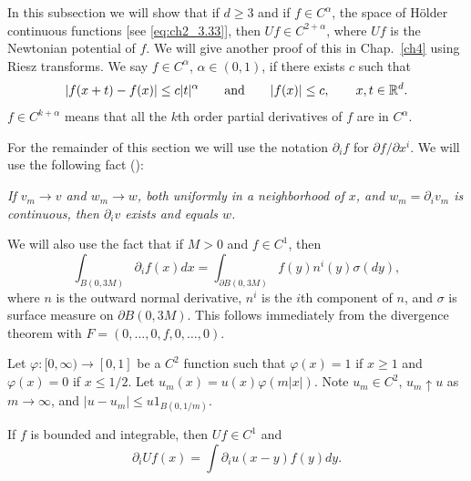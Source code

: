 

In this subsection we will show that if $d \geq 3$ and if $f \in C^\alpha$, the space of H\"older continuous functions [see \eqref{eq:ch2_3.33}], then $Uf \in C^{2+\alpha}$, where $Uf$ is the Newtonian potential of $f$. We will give another proof of this in Chap.\ \ref{ch4} using Riesz transforms. We say $f \in C^\alpha$, $\alpha \in (0,1)$, if there exists $c$ such that
\[
    |f(x+t) - f(x)| \leq c|t|^\alpha \qquad\text{and}\qquad |f(x)| \leq c, \qquad x,t \in \mathbb{R}^d.
\]
$f \in C^{k+\alpha}$ means that all the $k$th order partial derivatives of $f$ are in $C^\alpha$.

For the remainder of this section we will use the notation $\partial_i f$ for $\partial f/\partial x^i$. We will use the following fact (\cite[see][]{Rudin1976}):

\begin{obs}\label{obs:ch2_3.30}
\textit{If $v_m \to v$ and $w_m \to w$, both uniformly in a neighborhood of $x$, and $w_m = \partial_iv_m$ is continuous, then $\partial_iv$ exists and equals $w$.}
\end{obs}

We will also use the fact that if $M > 0$ and $f \in C^1$, then
\begin{equation}\label{eq:ch2_3.31}
    \int_{B(0,3M)} \partial_if(x)dx = \int_{\partial B(0,3M)} f(y)n^i(y)\sigma(dy),
\end{equation}
where $n$ is the outward normal derivative, $n^i$ is the $i$th component of $n$, and $\sigma$ is surface measure on $\partial B(0,3M)$. This follows immediately from the divergence theorem with $F = (0,\ldots,0,f,0,\ldots,0)$.

Let $\varphi : [0,\infty) \to [0,1]$ be a $C^2$ function such that $\varphi(x) = 1$ if $x \geq 1$ and $\varphi(x) = 0$ if $x \leq 1/2$. Let $u_m(x) = u(x)\varphi(m|x|)$. Note $u_m \in C^2$, $u_m \uparrow u$ as $m \to \infty$, and $|u-u_m| \leq u1_{B(0,1/m)}$.

\begin{proposition}\label{prop:ch2_3.12}
If $f$ is bounded and integrable, then $Uf \in C^1$ and
\begin{equation}\label{eq:ch2_3.32}
\partial_iUf(x) = \int \partial_iu(x-y)f(y)dy.
\end{equation}
\end{proposition}

